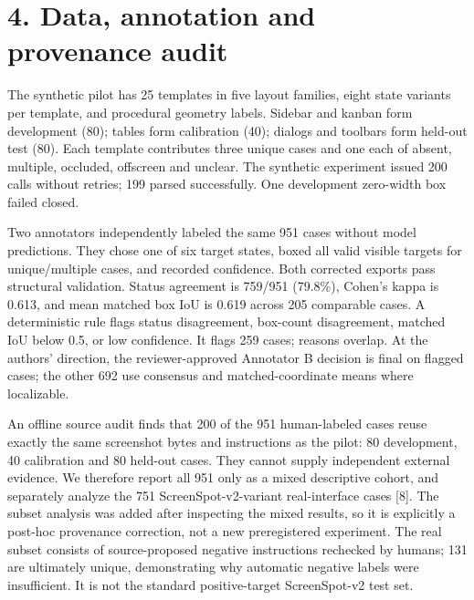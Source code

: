 \documentclass[10pt]{article}
\begin{document}
\section*{4. Data, annotation and provenance audit}
The synthetic pilot has 25 templates in five layout families, eight state variants per template, and procedural geometry labels. Sidebar and kanban form development (80); tables form calibration (40); dialogs and toolbars form held-out test (80). Each template contributes three unique cases and one each of absent, multiple, occluded, offscreen and unclear. The synthetic experiment issued 200 calls without retries; 199 parsed successfully. One development zero-width box failed closed.

Two annotators independently labeled the same 951 cases without model predictions. They chose one of six target states, boxed all valid visible targets for unique/multiple cases, and recorded confidence. Both corrected exports pass structural validation. Status agreement is 759/951 (79.8\%), Cohen's kappa is 0.613, and mean matched box IoU is 0.619 across 205 comparable cases. A deterministic rule flags status disagreement, box-count disagreement, matched IoU below 0.5, or low confidence. It flags 259 cases; reasons overlap. At the authors' direction, the reviewer-approved Annotator B decision is final on flagged cases; the other 692 use consensus and matched-coordinate means where localizable.

An offline source audit finds that 200 of the 951 human-labeled cases reuse exactly the same screenshot bytes and instructions as the pilot: 80 development, 40 calibration and 80 held-out cases. They cannot supply independent external evidence. We therefore report all 951 only as a mixed descriptive cohort, and separately analyze the 751 ScreenSpot-v2-variant real-interface cases [8]. The subset analysis was added after inspecting the mixed results, so it is explicitly a post-hoc provenance correction, not a new preregistered experiment. The real subset consists of source-proposed negative instructions rechecked by humans; 131 are ultimately unique, demonstrating why automatic negative labels were insufficient. It is not the standard positive-target ScreenSpot-v2 test set.
\end{document}
